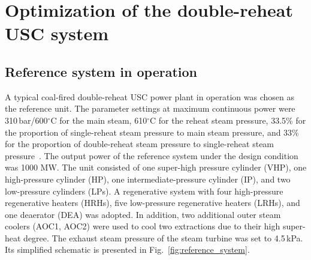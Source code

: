 \documentclass[preprint,12pt]{elsarticle}
\begin{document}
\section{Optimization of the double-reheat USC system}
\label{sec2:system intro}
\subsection{Reference system in operation} %
\label{sub2:ref intro}
A typical coal-fired double-reheat USC power plant in operation was chosen as the reference unit.
The parameter settings at maximum continuous power were 310\,bar/600$^\circ$C for the main steam, 610$^\circ$C for the reheat steam pressure, 33.5\% for the proportion of single-reheat steam pressure to main steam pressure, and 33\% for the proportion of double-reheat steam pressure to single-reheat steam pressure~\cite{Zhao2017Exergy}.
The output power of the reference system under the design condition was 1000 MW.
The unit consisted of one super-high pressure cylinder (VHP), one high-pressure cylinder (HP), one intermediate-pressure cylinder (IP), and two low-pressure cylinders (LPs).
A regenerative system with four high-pressure regenerative heaters (HRHs), five low-pressure regenerative heaters (LRHs), and one deaerator (DEA) was adopted.
In addition, two additional outer steam coolers (AOC1, AOC2) were used to cool two extractions due to their high super-heat degree. The exhaust steam pressure of the steam turbine was set to 4.5\,kPa. Its simplified schematic is presented in Fig.~\ref{fig:reference_system}.
\end{document}
